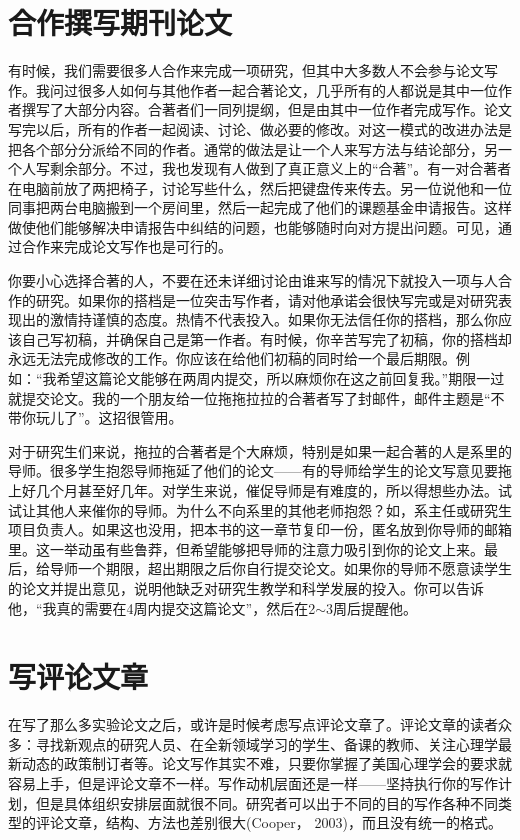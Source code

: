 \section{合作撰写期刊论文}
有时候，我们需要很多人合作来完成一项研究，但其中大多数人不会参与论文写作。我问过很多人如何与其他作者一起合著论文，几乎所有的人都说是其中一位作者撰写了大部分内容。合著者们一同列提纲，但是由其中一位作者完成写作。论文写完以后，所有的作者一起阅读、讨论、做必要的修改。对这一模式的改进办法是把各个部分分派给不同的作者。通常的做法是让一个人来写方法与结论部分，另一个人写剩余部分。不过，我也发现有人做到了真正意义上的“合著”。有一对合著者在电脑前放了两把椅子，讨论写些什么，然后把键盘传来传去。另一位说他和一位同事把两台电脑搬到一个房间里，然后一起完成了他们的课题基金申请报告。这样做使他们能够解决申请报告中纠结的问题，也能够随时向对方提出问题。可见，通过合作来完成论文写作也是可行的。

你要小心选择合著的人，不要在还未详细讨论由谁来写的情况下就投入一项与人合作的研究。如果你的搭档是一位突击写作者，请对他承诺会很快写完或是对研究表现出的激情持谨慎的态度。热情不代表投入。如果你无法信任你的搭档，那么你应该自己写初稿，并确保自己是第一作者。有时候，你辛苦写完了初稿，你的搭档却永远无法完成修改的工作。你应该在给他们初稿的同时给一个最后期限。例如：“我希望这篇论文能够在两周内提交，所以麻烦你在这之前回复我。”期限一过就提交论文。我的一个朋友给一位拖拖拉拉的合著者写了封邮件，邮件主题是“不带你玩儿了”。这招很管用。

对于研究生们来说，拖拉的合著者是个大麻烦，特别是如果一起合著的人是系里的导师。很多学生抱怨导师拖延了他们的论文——有的导师给学生的论文写意见要拖上好几个月甚至好几年。对学生来说，催促导师是有难度的，所以得想些办法。试试让其他人来催你的导师。为什么不向系里的其他老师抱怨？如，系主任或研究生项目负责人。如果这也没用，把本书的这一章节复印一份，匿名放到你导师的邮箱里。这一举动虽有些鲁莽，但希望能够把导师的注意力吸引到你的论文上来。最后，给导师一个期限，超出期限之后你自行提交论文。如果你的导师不愿意读学生的论文并提出意见，说明他缺乏对研究生教学和科学发展的投入。你可以告诉他，“我真的需要在4周内提交这篇论文”，然后在2$\sim$3周后提醒他。


\section{写评论文章}
在写了那么多实验论文之后，或许是时候考虑写点评论文章了。评论文章的读者众多：寻找新观点的研究人员、在全新领域学习的学生、备课的教师、关注心理学最新动态的政策制订者等。论文写作其实不难，只要你掌握了美国心理学会的要求就容易上手，但是评论文章不一样。写作动机层面还是一样——坚持执行你的写作计划，但是具体组织安排层面就很不同。研究者可以出于不同的目的写作各种不同类型的评论文章，结构、方法也差别很大(Cooper， 2003)，而且没有统一的格式。

